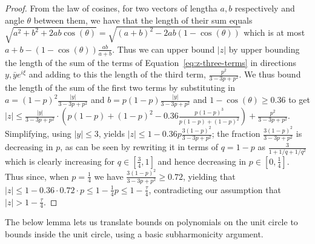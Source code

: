 \documentclass[11pt]{article}
\theoremstyle{plain}
\begin{document}
\begin{proof}
From the law of cosines, for two vectors of lengtha $a,b$ respectively and angle $\theta$ between them, we have that the length of their sum equals $\sqrt{a^2+b^2+2ab\cos(\theta)}=\sqrt{(a+b)^2-2ab(1-\cos(\theta))}$ which is at most $a+b-(1-\cos(\theta))\frac{a b}{a+b}$. Thus we can upper bound $|z|$ by upper bounding the length of the sum of the terms of Equation~\ref{eq:z-three-terms} in directions $y,\bar{y}e^{i\xi}$ and adding to this the length of the third term, $\frac{p^2}{3-3p+p^2}$. We thus bound the length of the sum of the first two terms by substituting in $a=(1-p)^2\frac{|y|}{3-3p+p^2}$ and $b=p(1-p)\frac{|y|}{3-3p+p^2}$ and $1-\cos(\theta)\geq 0.36$ to get $|z|\leq \frac{|y|}{3-3p+p^2}\cdot\left(p(1-p)+(1-p)^2- 0.36\frac{p(1-p)^3}{p(1-p)+(1-p)^2}\right) +\frac{p^2}{3-3p+p^2}$. Simplifying, using $|y|\leq 3$, yields $|z|\leq 1-0.36 p \frac{3(1-p)^2
}{3-3p+p^2}$; the fraction $\frac{3(1-p)^2
}{3-3p+p^2}$ is decreasing in $p$, as can be seen by rewriting it in terms of $q=1-p$ as $\frac{3}{1+1/q+1/q^2}$ which is clearly increasing for $q\in[\frac{3}{4},1]$ and hence decreasing in $p\in [0,\frac{1}{4}]$. Thus since, when $p=\frac{1}{4}$ we have $\frac{3(1-p)^2
}{3-3p+p^2}\geq 0.72$, yielding that $|z|\leq 1-0.36 \cdot 0.72\cdot p\leq 1-\frac{1}{4}p\leq  1-\frac{\tau}{4}$, contradicting our assumption that $|z|>1-\frac{\tau}{4}$.
\end{proof}





The below lemma lets us translate bounds on polynomials on the unit circle to bounds inside the unit circle, using a basic subharmonicity argument.
\end{document}

